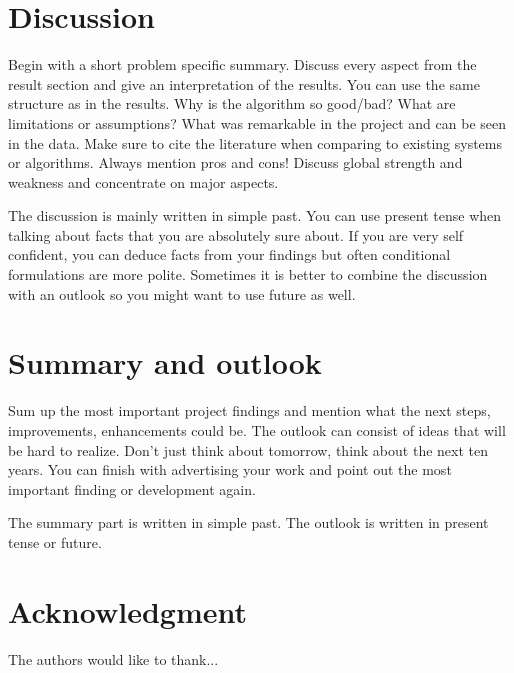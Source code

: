 \documentclass[conference]{IEEEtran}
\begin{document}
\section{Discussion}
Begin with a short problem specific summary. Discuss every aspect from the result section and give an interpretation of the results. You can use the same structure as in the results. Why is the algorithm so good/bad? What are limitations or assumptions? What was remarkable in the project and can be seen in the data. Make sure to cite the literature when comparing to existing systems or algorithms. Always mention pros and cons! Discuss global strength and weakness and concentrate on major aspects.

The discussion is mainly written in simple past. You can use present tense when talking about facts that you are absolutely sure about. If you are very self confident, you can deduce facts from your findings but often conditional formulations are more polite. Sometimes it is better to combine the discussion with an outlook so you might want to use future as well. 
 
\section{Summary and outlook}
Sum up the most important project findings and mention what the next steps, improvements, enhancements could be. The outlook can consist of ideas that will be hard to realize. Don't just think about tomorrow, think about the next ten years. You can finish with advertising your work and point out the most important finding or development again.

The summary part is written in simple past. The outlook is written in present tense or future.




\section*{Acknowledgment}


The authors would like to thank...
\end{document}
